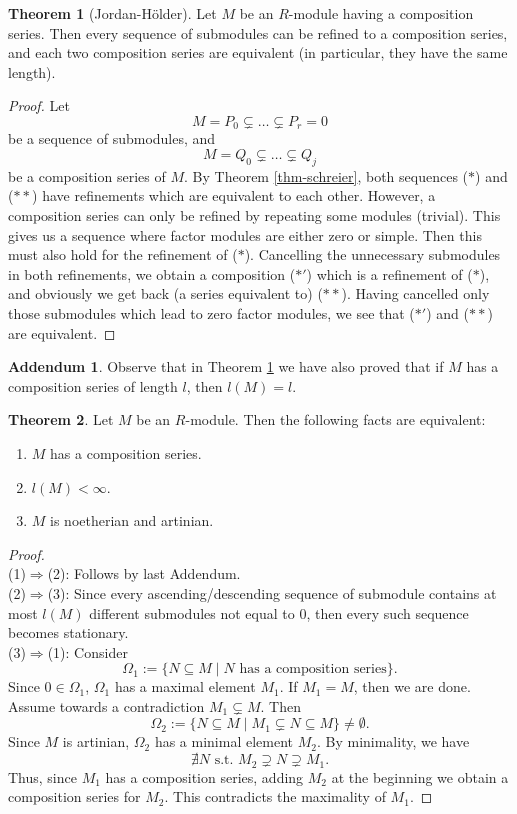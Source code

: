 \documentclass[12pt,a4paper]{report}
\theoremstyle{definition}
\newtheorem{theorem}{Theorem}[chapter] %
\newtheorem*{addendum}{Addendum}
\theoremstyle{num.custom-title}
\DeclareMathOperator{\imp}{\Rightarrow}
\DeclareMathOperator{\sse}{\subseteq}
\begin{document}
\begin{theorem}[Jordan-Hölder]\label{thm-jo-ho}
Let $M$ be an $R$-module having a composition series. Then every sequence of submodules can be refined to a composition series, and each two composition series are equivalent (in particular, they have the same length).
\begin{proof}
Let 
\[
M=P_0 \subsetneq \ldots \subsetneq P_r =0 \tag{$*$}
\]
be a sequence of submodules, and
\[
M=Q_0 \subsetneq \ldots \subsetneq Q_j \tag{$**$}
\]
be a composition series of $M$. By Theorem \ref{thm-schreier}, both sequences ($*$) and ($**$) have refinements which are equivalent to each other. However, a composition series can only be refined by repeating some modules (trivial). This gives us a sequence where factor modules are either zero or simple. Then this must also hold for the refinement of ($*$). Cancelling the unnecessary submodules in both refinements, we obtain a composition ($*'$) which is a refinement of ($*$), and obviously we get back (a series equivalent to) ($**$). Having cancelled only those submodules which lead to zero factor modules, we see that ($*'$) and ($**$) are equivalent.
\end{proof}
\end{theorem}

\begin{addendum}
Observe that in Theorem \ref{thm-jo-ho} we have also proved that if $M$ has a composition series of length $l$, then $l(M)=l$.
\end{addendum}

\begin{theorem}\label{char_exists_comp-series}
Let $M$ be an $R$-module. Then the following facts are equivalent:
\begin{enumerate}
\item $M$ has a composition series.
\item $l(M)<\infty$.
\item $M$ is noetherian and artinian.
\end{enumerate}
\begin{proof}\ \\
(1)$\imp$(2): Follows by last Addendum.
\\[6pt]
(2)$\imp$(3): Since every ascending/descending sequence of submodule contains at most $l(M)$ different submodules not equal to $0$, then every such sequence becomes stationary.
\\[6pt]
(3)$\imp$(1): Consider
\[
\Omega_1 := \{N \sse M \mid N \text{ has a composition series}\}.
\]
Since $0 \in \Omega_1$, $\Omega_1$ has a maximal element $M_1$. If $M_1=M$, then we are done. Assume towards a contradiction $M_1 \subsetneq M$. Then
\[
\Omega_2 := \{N \sse M \mid M_1 \subsetneq N \sse M\} \neq \emptyset.
\]
Since $M$ is artinian, $\Omega_2$ has a minimal element $M_2$. By minimality, we have
\[
\nexists N \text{ s.t. } M_2 \supsetneq N \supsetneq M_1.
\]
Thus, since $M_1$ has a composition series, adding $M_2$ at the beginning we obtain a composition series for $M_2$. This contradicts the maximality of $M_1$.
\end{proof}
\end{theorem}
\end{document}
